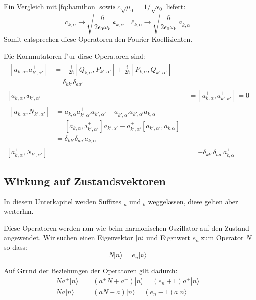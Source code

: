 Ein Vergleich mit \ref{fq:hamilton} sowie $c\sqrt{\mu_0}=1/\sqrt{\epsilon_0}$ liefert:
\begin{equation} \label{fq:opp_fourier}
 c_{k,\alpha} \rightarrow \sqrt{\frac{\hbar}{2 \epsilon_0 \omega_k}} \, a_{k,\alpha} \quad \bar{c}_{k,\alpha} \rightarrow \sqrt{\frac{\hbar}{2 \epsilon_0 \omega_k}} \, a^+_{k,\alpha}
\end{equation}
Somit entsprechen diese Operatoren den Fourier-Koeffizienten.

Die Kommutatoren f"ur diese Operatoren sind:
\begin{align*}
\begin{split}
[a_{k,\alpha} , a^+_{k',\alpha'}] &= - \frac{i}{2 \hbar} [Q_{k,\alpha}, P_{k',\alpha'}] + \frac{i}{2 \hbar} [P_{k,\alpha}, Q_{k',\alpha'}] \\
	 &= \delta_{kk'}\delta_{aa'}
\end{split}\\
[a_{k,\alpha} , a_{k',\alpha'}] &= [a^+_{k,\alpha} , a^+_{k',\alpha'}] = 0 \\
\begin{split}
[a_{k,\alpha} , N_{k',\alpha'}] &= a_{k,\alpha} a^+_{k',\alpha'} a_{k',\alpha'} - a^+_{k',\alpha'} a_{k',\alpha'} a_{k,\alpha} \\
	&= [a_{k,\alpha} , a^+_{k',\alpha'}]a_{k',\alpha'} - a^+_{k',\alpha'}[a_{k',\alpha'} , a_{k,\alpha}]\\
	&= \delta_{kk'}\delta_{aa'} a_{k,\alpha}
\end{split} \\
[a^+_{k,\alpha} , N_{k',\alpha'}] &= -\delta_{kk'}\delta_{aa'} a^+_{k,\alpha}
\end{align*}

\subsection{Wirkung auf Zustandsvektoren}

In diesem Unterkapitel werden Suffixes $_n$ und $_k$ weggelassen, diese gelten aber weiterhin. 

Diese Operatoren werden nun wie beim harmonischen Oszillator auf den Zustand angewendet. Wir suchen einen Eigenvektor $|n\rangle$ und Eigenwert $e_n$ zum Operator $N$ so dass:
\begin{equation*}
N|n\rangle = e_n|n\rangle
\end{equation*}

Auf Grund der Beziehungen der Operatoren gilt dadurch:
\begin{align*}
Na^+|n\rangle &= (a^+N + a^+)|n\rangle = (e_n + 1)a^+|n\rangle \\
Na|n\rangle &= (aN - a)|n\rangle = (e_n - 1)a|n\rangle
\end{align*}

